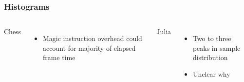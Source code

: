 \begin{frame}
  \frametitle{Histograms}

  \begin{columns}[t]


    Chess
    \begin{itemize}
    \item Magic instruction overhead could account for majority of elapsed frame time
    \end{itemize}

    Julia
    \begin{itemize}
    \item Two to three peaks in sample distribution
    \item Unclear why
    \end{itemize}


    \resizebox{\textwidth}{!}{%
      
    }

    \vspace{.5cm}

    \resizebox{\textwidth}{!}{%
      
    }

  \end{columns}

\end{frame}
